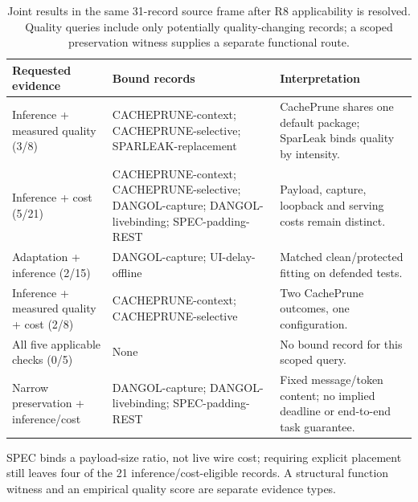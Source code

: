 \begin{table}[t]\centering\footnotesize
\caption{Joint results in the same 31-record source frame after R8 applicability is resolved. Quality queries include only potentially quality-changing records; a scoped preservation witness supplies a separate functional route.}\label{tab:r35-positive}
\begin{tabularx}{\textwidth}{@{}p{}p{}Y@{}}\toprule
Requested evidence & Bound records & Interpretation\\\midrule
Inference + measured quality (3/8) & CACHEPRUNE-\allowbreak{}context; CACHEPRUNE-\allowbreak{}selective; SPARLEAK-\allowbreak{}replacement & CachePrune shares one default package; SparLeak binds quality by intensity.\\
Inference + cost (5/21) & CACHEPRUNE-\allowbreak{}context; CACHEPRUNE-\allowbreak{}selective; DANGOL-\allowbreak{}capture; DANGOL-\allowbreak{}livebinding; SPEC-\allowbreak{}padding-\allowbreak{}REST & Payload, capture, loopback and serving costs remain distinct.\\
Adaptation + inference (2/15) & DANGOL-\allowbreak{}capture; UI-\allowbreak{}delay-\allowbreak{}offline & Matched clean/protected fitting on defended tests.\\
Inference + measured quality + cost (2/8) & CACHEPRUNE-\allowbreak{}context; CACHEPRUNE-\allowbreak{}selective & Two CachePrune outcomes, one configuration.\\
All five applicable checks (0/5) & None & No bound record for this scoped query.\\
\midrule Narrow preservation + inference/cost & DANGOL-capture; DANGOL-livebinding; SPEC-padding-REST & Fixed message/token content; no implied deadline or end-to-end task guarantee.\\
\bottomrule\end{tabularx}
\par\smallskip\raggedright SPEC binds a payload-size ratio, not live wire cost; requiring explicit placement still leaves four of the 21 inference/cost-eligible records. A structural function witness and an empirical quality score are separate evidence types.
\end{table}
